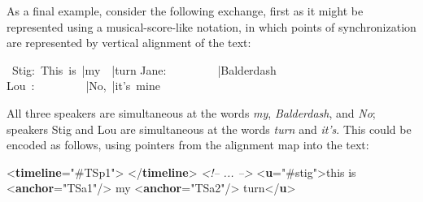 As a final example, consider the following exchange, first as it might be represented using a musical-score-like notation, in which points of synchronization are represented by vertical alignment of the text: \par\bgroup\exampleFont \begin{shaded}\noindent\mbox{} Stig: This is |my  |turn\newline
Jane:         |Balderdash\newline
Lou :         |No, |it's mine\end{shaded}\egroup\par \noindent  All three speakers are simultaneous at the words \textit{my}, \textit{Balderdash}, and \textit{No}; speakers Stig and Lou are simultaneous at the words \textit{turn} and \textit{it's}. This could be encoded as follows, using pointers from the alignment map into the text: \par\bgroup{}\exampleFont \begin{shaded}\noindent\mbox{}{<\textbf{timeline}\hspace*{1em}{origin}="{\#TSp1}">}\mbox{}\newline 
{}\mbox{}\newline 
{}\mbox{}\newline 
{</\textbf{timeline}>}\mbox{}\newline 
\textit{<!-- ... -->}\mbox{}\newline 
{<\textbf{u}\hspace*{1em}{who}="{\#stig}">}this is {<\textbf{anchor}\hspace*{1em}{xml:id}="{TSa1}"/>} my {<\textbf{anchor}\hspace*{1em}{xml:id}="{TSa2}"/>} turn{</\textbf{u}>}\mbox{}\newline 

\end{shaded}
